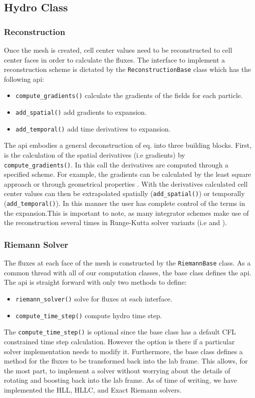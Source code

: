 \subsection{Hydro Class}
\subsubsection{Reconstruction}
Once the mesh is created, cell center values need to be reconstructed to cell center faces
in order to calculate the fluxes. The interface to implement a reconstruction
scheme is dictated by the \lstinline{ReconstructionBase} class which has the following api:
\begin{itemize}
	\item \lstinline{compute_gradients()} calculate the gradients of the fields for each particle.
    \item \lstinline{add_spatial()} add gradients to expansion.
    \item \lstinline{add_temporal()} add time derivatives to expansion.
\end{itemize}
The api embodies a general deconstruction of eq. into three building blocks. First, is the
calculation of the spatial derivatives (i.e gradients) by \lstinline{compute_gradients()}.
In this call the derivatives are computed through a specified scheme. For example, the gradients can be 
calculated by the least square approach \citep{Pakmor2016} or through geometrical properties 
\citep{Springel2010}. With the derivatives calculated cell center values can then be extrapolated spatially
(\lstinline{add_spatial()}) or temporally (\lstinline{add_temporal()}). In this manner the
user has complete control of the terms in the expansion.This is important to note, as many integrator 
schemes make use of the reconstruction several times in Runge-Kutta solver variants (i.e \cite{Pakmor2016} 
and \cite{Duffell2011}).

\subsubsection{Riemann Solver}
The fluxes at each face of the mesh is constructed by the \lstinline{RiemannBase} class.
As a common thread with all of our computation classes, the base class defines the api.
The api is straight forward with only two methods to define:
\begin{itemize}
	\item \lstinline{riemann_solver()} solve for fluxes at each interface.
    \item \lstinline{compute_time_step()} compute hydro time step.
\end{itemize}
The \lstinline{compute_time_step()} is optional since the base class has a default
CFL constrained time step calculation. However the option is there if a particular 
solver implementation needs to modify it. Furthermore, the base class defines a 
method for the fluxes to be transformed back into the lab frame. This allows,
for the most part, to implement a solver without worrying about the details of
rotating and boosting back into the lab frame. As of time of writing, we have
implemented the HLL, HLLC, and Exact Riemann solvers.

